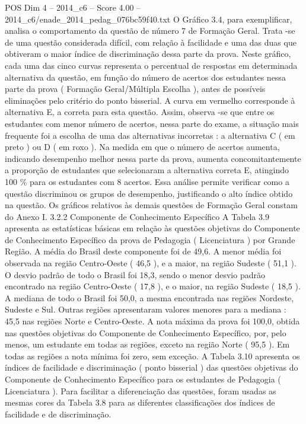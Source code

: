 \begin{textsample}{POS Dim 4 – 2014\_c6 – Score 4.00 – 2014\_c6/enade\_2014\_pedag\_076bc59f40.txt}
O Gráfico 3.4, para exemplificar, analisa o comportamento da questão de número 7 de Formação Geral.
Trata -se de uma questão considerada difícil, com relação à facilidade e uma das duas que obtiveram o maior índice de discriminação dessa parte da prova.
Neste gráfico, cada uma das cinco curvas representa o percentual de respostas em determinada alternativa da questão, em função do número de acertos dos estudantes nessa parte da prova ( Formação Geral/Múltipla Escolha ), antes de possíveis eliminações pelo critério do ponto bisserial.
A curva em vermelho corresponde à alternativa E, a correta para esta questão.
Assim, observa -se que entre os estudantes com menor número de acertos, nessa parte do exame, a situação mais frequente foi a escolha de uma das alternativas incorretas : a alternativa C ( em preto ) ou D ( em roxo ).
Na medida em que o número de acertos aumenta, indicando desempenho melhor nessa parte da prova, aumenta concomitantemente a proporção de estudantes que selecionaram a alternativa correta E, atingindo 100 \% para os estudantes com 8 acertos.
Essa análise permite verificar como a questão discriminou os grupos de desempenho, justificando o alto índice obtido na questão.
Os gráficos relativos às demais questões de Formação Geral constam do Anexo I. 3.2.2 Componente de Conhecimento Específico A Tabela 3.9 apresenta as estatísticas básicas em relação às questões objetivas do Componente de Conhecimento Específico da prova de Pedagogia ( Licenciatura ) por Grande Região.
A média do Brasil deste componente foi de 49,6.
A menor média foi observada na região Centro-Oeste ( 46,5 ), e a maior, na região Sudeste ( 51,1 ).
O desvio padrão de todo o Brasil foi 18,3, sendo o menor desvio padrão encontrado na região Centro-Oeste ( 17,8 ), e o maior, na região Sudeste ( 18,5 ).
A mediana de todo o Brasil foi 50,0, a mesma encontrada nas regiões Nordeste, Sudeste e Sul.
Outras regiões apresentaram valores menores para a mediana : 45,5 nas regiões Norte e Centro-Oeste.
A nota máxima da prova foi 100,0, obtida nas questões objetivas do Componente de Conhecimento Específico, por, pelo menos, um estudante em todas as regiões, exceto na região Norte ( 95,5 ).
Em todas as regiões a nota mínima foi zero, sem exceção.
A Tabela 3.10 apresenta os índices de facilidade e discriminação ( ponto bisserial ) das questões objetivas do Componente de Conhecimento Específico para os estudantes de Pedagogia ( Licenciatura ).
Para facilitar a diferenciação das questões, foram usadas as mesmas cores da Tabela 3.8 para as diferentes classificações dos índices de facilidade e de discriminação.

\end{textsample}
